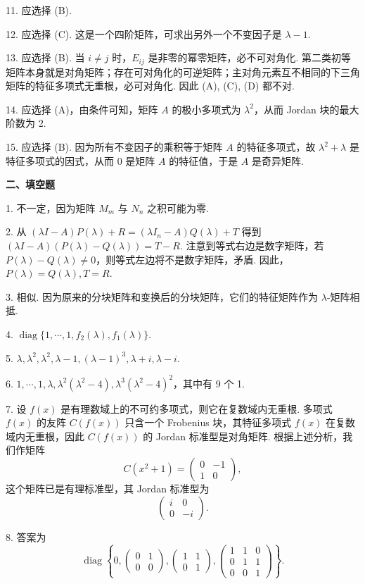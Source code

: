 \documentclass[UTF8, 12pt, fontset=fandol, oneside]{ctexart}
\begin{document}
11. 应选择 (B).

12. 应选择 (C). 这是一个四阶矩阵，可求出另外一个不变因子是 $\lambda-1$.

13. 应选择 (B). 当 $i\ne j$ 时，$E_{ij}$ 是非零的幂零矩阵，必不可对角化. 第二类初等矩阵本身就是对角矩阵；存在可对角化的可逆矩阵；主对角元素互不相同的下三角矩阵的特征多项式无重根，必可对角化. 因此 (A), (C), (D) 都不对.

14. 应选择 (A)，由条件可知，矩阵 $A$ 的极小多项式为 $\lambda^2$，从而 Jordan 块的最大阶数为 2.

15. 应选择 (B). 因为所有不变因子的乘积等于矩阵 $A$ 的特征多项式，故 $\lambda^2+\lambda$ 是特征多项式的因式，从而 0 是矩阵 $A$ 的特征值，于是 $A$ 是奇异矩阵.

\noindent\textbf{二、填空题}

1. 不一定，因为矩阵 $M_m$ 与 $N_n$ 之积可能为零.

2. 从 $(\lambda I-A)P(\lambda)+R=(\lambda I_n-A)Q(\lambda)+T$ 得到 $(\lambda I-A)(P(\lambda)-Q(\lambda))=T-R$. 注意到等式右边是数字矩阵，若 $P(\lambda)-Q(\lambda)\ne0$，则等式左边将不是数字矩阵，矛盾. 因此，$P(\lambda)=Q(\lambda),T=R$.

3. 相似. 因为原来的分块矩阵和变换后的分块矩阵，它们的特征矩阵作为 $\lambda$-矩阵相抵.

4. $\operatorname{diag}\{1,\cdots,1,f_2(\lambda),f_1(\lambda)\}$.

5. $\lambda,\lambda^2,\lambda^2,\lambda-1,(\lambda-1)^3,\lambda+i,\lambda-i$.

6. $1,\cdots,1,\lambda,\lambda^2(\lambda^2-4),\lambda^3(\lambda^2-4)^2$，其中有 9 个 1.

7. 设 $f(x)$ 是有理数域上的不可约多项式，则它在复数域内无重根. 多项式 $f(x)$ 的友阵 $C(f(x))$ 只含一个 Frobenius 块，其特征多项式 $f(x)$ 在复数域内无重根，因此 $C(f(x))$ 的 Jordan 标准型是对角矩阵. 根据上述分析，我们作矩阵
\[
C(x^2+1)=\left(\begin{array}{rr}0&-1\\1&0\end{array}\right),
\]
这个矩阵已是有理标准型，其 Jordan 标准型为
\[
\left(\begin{array}{cc}i&0\\0&-i\end{array}\right).
\]

8. 答案为
\[
\operatorname{diag}\left\{0,\left(\begin{array}{cc}0&1\\0&0\end{array}\right),\left(\begin{array}{cc}1&1\\0&1\end{array}\right),\left(\begin{array}{ccc}1&1&0\\0&1&1\\0&0&1\end{array}\right)\right\}.
\]
\end{document}
